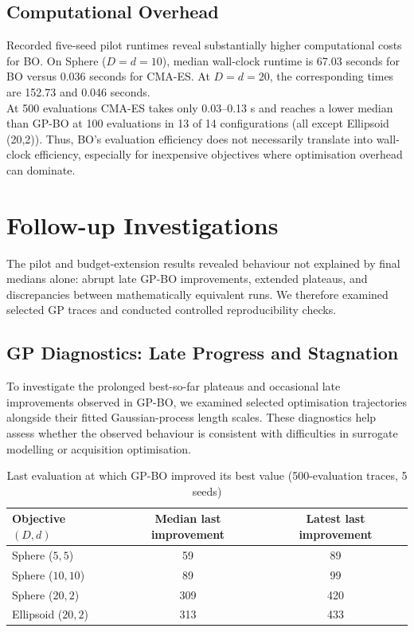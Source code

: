 \documentclass[11pt]{article}
\begin{document}
\subsection{Computational Overhead}

\noindent Recorded five-seed pilot runtimes reveal substantially higher computational costs for BO. On Sphere ($D=d=10$), median wall-clock runtime is 67.03 seconds for BO versus 0.036 seconds for CMA-ES. At $D=d=20$, the corresponding times are 152.73 and 0.046 seconds.\\

\noindent At 500 evaluations CMA-ES takes only 0.03–0.13 s and reaches a lower median than GP-BO at 100 evaluations in 13 of 14 configurations (all except Ellipsoid (20,2)). Thus, BO's evaluation efficiency does not necessarily translate into wall-clock efficiency, especially for inexpensive objectives where optimisation overhead can dominate.


\section{Follow-up Investigations}
The pilot and budget-extension results revealed behaviour not explained by final medians alone: abrupt late GP-BO improvements, extended plateaus, and discrepancies between mathematically equivalent runs. We therefore examined selected GP traces and conducted controlled reproducibility checks.

\subsection{GP Diagnostics: Late Progress and Stagnation}
To investigate the prolonged best-so-far plateaus and occasional late improvements observed in GP-BO, we examined selected optimisation trajectories alongside their fitted Gaussian-process length scales. These diagnostics help assess whether the observed behaviour is consistent with difficulties in surrogate modelling or acquisition optimisation.

\begin{table}[H]
    \centering
    \setcounter{table}{0}
    \renewcommand{\thetable}{5.\arabic{table}}
    \caption{Last evaluation at which GP-BO improved its best value (500-evaluation traces, 5 seeds)}
    \label{tab:last_improvement}
    \begin{tabular}{lcc}
        \hline
        \textbf{Objective $(D,d)$} & \textbf{Median last improvement} & \textbf{Latest last improvement} \\
        \hline
        Sphere ($5, 5$) & 59 & 89 \\
        Sphere ($10, 10$) & 89 & 99 \\
        Sphere ($20, 2$) & 309 & 420 \\
        Ellipsoid ($20, 2$) & 313 & 433 \\
        \hline
    \end{tabular}
\end{table}
\end{document}
